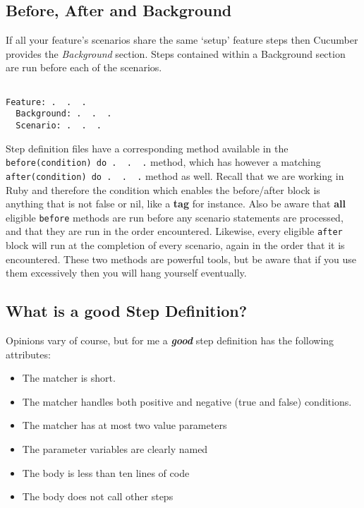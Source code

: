 \subsection{Before, After and Background}

If all your feature's scenarios share the same `setup' feature steps then Cucumber provides the \emph{Background} section.  Steps contained within a Background section are run before each of the scenarios.

\begin{verbatim}

Feature: .  .  .
  Background: .  .  .
  Scenario: .  .  .

\end{verbatim}

Step definition files have a corresponding method available in the \verb+before(condition) do .  .  .+ method, which has however a matching \verb+after(condition) do .  .  .+ method as well.  Recall that we are working in Ruby and therefore the condition which enables the before/after block is anything that is not false or nil, like a \textbf{tag} for instance.  Also be aware that \textbf{all} eligible \verb+before+ methods are run before any scenario statements are processed, and that they are run in the order encountered.  Likewise, every eligible \verb+after+ block will run at the completion of every scenario, again in the order that it is encountered.  These two methods are powerful tools, but be aware that if you use them excessively then you will hang yourself eventually.

\subsection{What is a good Step Definition?}

Opinions vary of course, but for me a \textbf{\emph{good}} step definition has the following attributes:

\begin{itemize}
  \item The matcher is short.
  \item The matcher handles both positive and negative (true and false) conditions.
  \item The matcher has at most two value parameters
  \item The parameter variables are clearly named
  \item The body is less than ten lines of code
  \item The body does not call other steps
\end{itemize}


